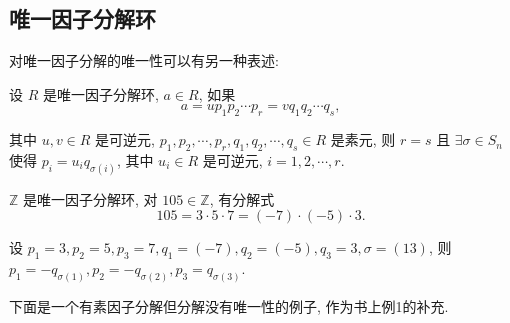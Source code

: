 \documentclass[color=black,device=normal,lang=cn,mode=geye]{elegantnote}
\begin{document}
\subsection{唯一因子分解环}
对唯一因子分解的唯一性可以有另一种表述:
\begin{definition}
    设 $R$ 是唯一因子分解环, $a\in R$, 如果
    \[a=up_1p_2\cdots p_r=vq_1q_2\cdots q_s,\]

    其中 $u,v\in R$ 是可逆元, $p_1,p_2,\cdots,p_r,q_1,q_2,\cdots,q_s\in R$ 是素元, 则 $r=s$ 且 $\exists\sigma\in S_n$ 使得 $p_i=u_iq_{\sigma(i)}$, 其中 $u_i\in R$ 是可逆元, $i=1,2,\cdots,r$.
\end{definition}
\begin{example}
    $\mathbb{Z}$ 是唯一因子分解环, 对 $105\in\mathbb{Z}$, 有分解式
    \[105=3\cdot 5\cdot 7=(-7)\cdot(-5)\cdot 3.\]

    设 $p_1=3,p_2=5,p_3=7,q_1=(-7),q_2=(-5),q_3=3,\sigma=(13)$, 则 $p_1=-q_{\sigma(1)},p_2=-q_{\sigma(2)},p_3=q_{\sigma(3)}$.
\end{example}
下面是一个有素因子分解但分解没有唯一性的例子, 作为书上例1的补充.
\end{document}

